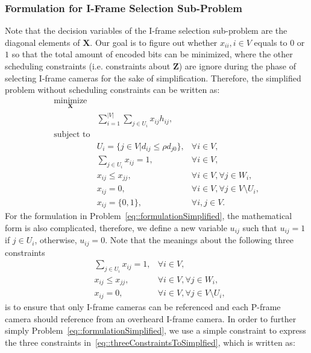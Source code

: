 \subsubsection{Formulation for I-Frame Selection Sub-Problem}
\label{sec::iFrameSelectionSubProbFormulation}
Note that the decision variables of the I-frame selection sub-problem are the diagonal elements of $\mathbf{X}$.
Our goal is to figure out whether ${x_{ii},i \in V}$ equals to $0$ or $1$ so that the total amount of encoded bits can be minimized, where the other scheduling constraints (i.e. constraints about $\mathbf{Z}$) are ignore during the phase of selecting I-frame cameras for the sake of simplification.
Therefore, the simplified problem without scheduling constraints can be written as:
\begin{align}
\underset{\mathbf{X}}{\text{minimize}} & & \nonumber \\
	&\sum_{i=1}^{|V|} \sum_{j \in U_i}  x_{ij} h_{ij}, & \nonumber \\
\text{subject to} & & \nonumber \\
	&U_i = \{ j \in V | d_{ij} \leq \rho d_{j0} \}, &\forall i \in V, \nonumber \\
	&\sum_{j \in U_i} x_{ij} = 1, &\forall i \in V, \nonumber \\
	&x_{ij} \leq x_{jj}, &\forall i \in V, \forall j \in W_i, \nonumber \\
	&x_{ij} = 0, &\forall i \in V, \forall j \in V \setminus U_i, \nonumber \\
	&x_{ij} = \{0,1\}, &\forall i,j \in V.
\label{eq::formulationSimplified}
\end{align}
For the formulation in Problem~\eqref{eq::formulationSimplified}, the mathematical form is also complicated, therefore, we define a new variable $u_{ij}$ such that $u_{ij} = 1$ if $j \in U_i$, otherwise, $u_{ij} = 0$.
Note that the meanings about the following three constraints
\begin{align}
&\sum_{j \in U_i} x_{ij} = 1, &\forall i \in V, \nonumber \\
&x_{ij} \leq x_{jj}, &\forall i \in V, \forall j \in W_i, \nonumber \\
&x_{ij} = 0, &\forall i \in V, \forall j \in V \setminus U_i,
\label{eq::threeConstraintsToSimplfied}
\end{align}
is to ensure that only I-frame cameras can be referenced and each P-frame camera should reference from an overheard I-frame camera.
In order to further simply Problem~\eqref{eq::formulationSimplified}, we use a simple constraint to express the three constraints in~\eqref{eq::threeConstraintsToSimplfied}, which is written as:
